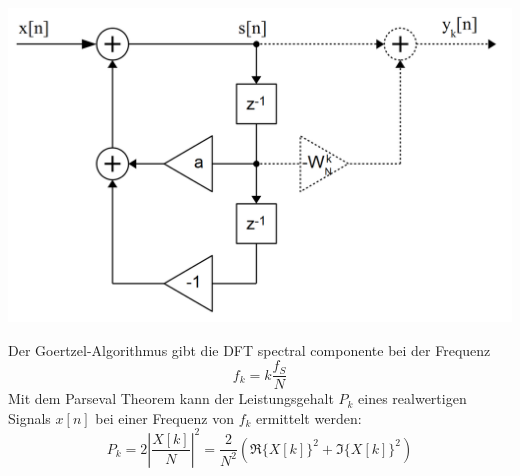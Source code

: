 \begin{center}
	\includegraphics[scale=.7]{./images/goertzel}
\end{center}
Der Goertzel-Algorithmus gibt die DFT spectral componente bei der Frequenz
\[ f_k = k\frac{f_S}{N} \]
Mit dem Parseval Theorem kann der Leistungsgehalt $P_k$ eines realwertigen
Signals $x[n]$ bei einer Frequenz von $f_k$ ermittelt werden:
\[
	P_k = 2\left| \frac{X[k]}{N} \right|^2
		= \frac{2}{N^2}(\Re\{X[k]\}^2+\Im\{X[k]\}^2)
\]